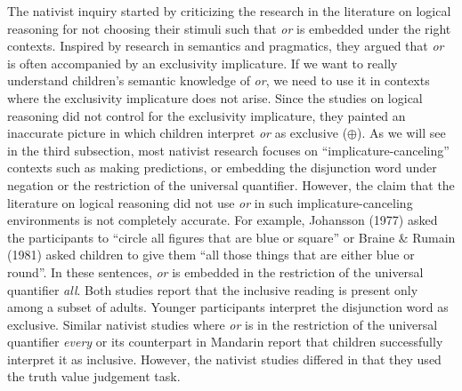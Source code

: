 \documentclass[oneside]{report}
\theoremstyle{definition}
\theoremstyle{definition}
\theoremstyle{definition}
\theoremstyle{remark}
\begin{document}
The nativist inquiry started by criticizing the research in the
literature on logical reasoning for not choosing their stimuli such that
\emph{or} is embedded under the right contexts. Inspired by research in
semantics and pragmatics, they argued that \emph{or} is often
accompanied by an exclusivity implicature. If we want to really
understand children's semantic knowledge of \emph{or}, we need to use it
in contexts where the exclusivity implicature does not arise. Since the
studies on logical reasoning did not control for the exclusivity
implicature, they painted an inaccurate picture in which children
interpret \emph{or} as exclusive (\(\oplus\)). As we will see in the
third subsection, most nativist research focuses on
``implicature-canceling'' contexts such as making predictions, or
embedding the disjunction word under negation or the restriction of the
universal quantifier. However, the claim that the literature on logical
reasoning did not use \emph{or} in such implicature-canceling
environments is not completely accurate. For example, Johansson (1977)
asked the participants to ``circle all figures that are blue or square''
or Braine \& Rumain (1981) asked children to give them ``all those
things that are either blue or round''. In these sentences, \emph{or} is
embedded in the restriction of the universal quantifier \emph{all}. Both
studies report that the inclusive reading is present only among a subset
of adults. Younger participants interpret the disjunction word as
exclusive. Similar nativist studies where \emph{or} is in the
restriction of the universal quantifier \emph{every} or its counterpart
in Mandarin report that children successfully interpret it as inclusive.
However, the nativist studies differed in that they used the truth value
judgement task.
\end{document}
